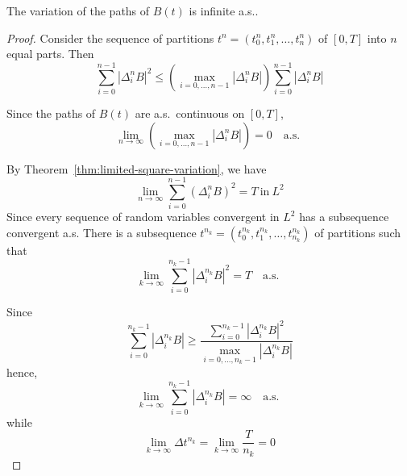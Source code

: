 \begin{theorem}
	The variation of the paths of \(B(t)\) is infinite a.s..
\end{theorem}

\begin{proof}
	Consider the sequence of partitions \(t^{n}=\left(t_{0}^{n},t_{1}^{n},\ldots,t_{n}^{n}\right)\) of \([0,T]\) into \(n\) equal parts. Then
	\begin{equation*}
		\sum_{i=0}^{n-1}\left|\Delta_{i}^{n}B\right|^{2}\leq\left(\max_{i=0,\ldots,n-1}\left|\Delta_{i}^{n}B\right|\right)\sum_{i=0}^{n-1}\left|\Delta_{i}^{n}B\right|
	\end{equation*}

	Since the paths of \(B(t)\) are a.s.\ continuous on \([0,T]\),
	\begin{equation*}
		\lim_{n\rightarrow\infty}\left(\max_{i=0,\ldots,n-1}\left|\Delta_{i}^{n}B\right|\right)=0\quad\text{a.s. }
	\end{equation*}

	By Theorem~\ref{thm:limited-square-variation}, we have
	\begin{equation*}
		\lim_{n\rightarrow\infty}\sum_{i=0}^{n-1}\left(\Delta_{i}^{n}B\right)^{2}=T\ \text{in}\ L^{2}
	\end{equation*}
	Since every sequence of random variables convergent in \(L^{2}\) has a subsequence convergent a.s. There is a subsequence \(t^{n_{k}}=\left(t_{0}^{n_{k}},t_{1}^{n_{k}},\ldots,t_{n_{k}}^{n_{k}}\right)\) of partitions such that
	\begin{equation*}
		\lim_{k\rightarrow\infty}\sum_{i=0}^{n_{k}-1}\left|\Delta_{i}^{n_{k}}B\right|^{2}=T\quad\text{a.s. }
	\end{equation*}

	Since
	\begin{equation*}
		\sum_{i=0}^{n_{k}-1}\left|\Delta_{i}^{n_{k}}B\right|\geq\frac{\sum_{i=0}^{n_{k}-1}\left|\Delta_{i}^{n_{k}}B\right|^{2}}{\max_{i=0,\ldots,n_{k}-1}\left|\Delta_{i}^{n_{k}}B\right|}
	\end{equation*}
	hence,
	\begin{equation*}
		\lim_{k\rightarrow\infty}\sum_{i=0}^{n_{k}-1}\left|\Delta_{i}^{n_{k}}B\right|=\infty\quad\text{a.s. }
	\end{equation*}
	while
	\begin{equation*}
		\lim_{k\rightarrow\infty}\Delta t^{n_{k}}=\lim_{k\rightarrow\infty}\frac{T}{n_{k}}=0
	\end{equation*}
\end{proof}

